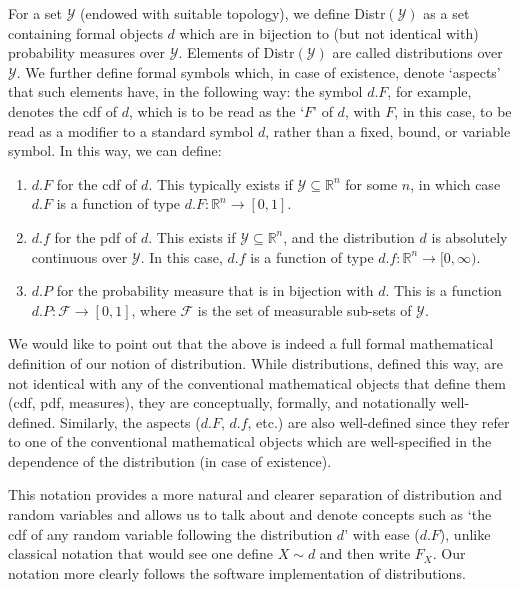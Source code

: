 For a set $\mathcal{Y}$ (endowed with suitable topology), we define Distr$(\mathcal{Y})$ as a set containing formal objects $d$ which are in bijection to (but not identical with) probability measures over $\mathcal{Y}$. Elements of Distr$(\mathcal{Y})$ are called distributions over $\mathcal{Y}$.
We further define formal symbols which, in case of existence, denote `aspects' that such elements have, in the following way: the symbol $d.F$, for example, denotes the cdf of $d$, which is to be read as the `$F$' of $d$, with $F$, in this case, to be read as a modifier to a standard symbol $d$, rather than a fixed, bound, or variable symbol. In this way, we can define:
\begin{enumerate}
\itemsep-0.2em
\item[(i)] $d.F$ for the cdf of $d$. This typically exists if $\mathcal{Y}\subseteq \mathbb{R}^n$ for some $n$, in which case $d.F$ is a function of type $d.F: \mathbb{R}^n \rightarrow [0,1]$.
\item[(ii)] $d.f$ for the pdf of $d$. This exists if $\mathcal{Y}\subseteq \mathbb{R}^n$, and the distribution $d$ is absolutely continuous over $\mathcal{Y}$. In this case, $d.f$ is a function of type $d.f: \mathbb{R}^n \rightarrow [0,\infty)$.
\item[(iii)] $d.P$ for the probability measure that is in bijection with $d$. This is a function $d.P: \mathcal{F} \rightarrow [0,1]$, where $\mathcal{F}$ is the set of measurable sub-sets of $\mathcal{Y}$.
\end{enumerate}

We would like to point out that the above is indeed a full formal mathematical definition of our notion of distribution. While distributions, defined this way, are not identical with any of the conventional mathematical objects that define them (cdf, pdf, measures), they are conceptually, formally, and notationally well-defined. Similarly, the aspects ($d.F$, $d.f$, etc.) are also well-defined since they refer to one of the conventional mathematical objects which are well-specified in the dependence of the distribution (in case of existence).

This notation provides a more natural and clearer separation of distribution and random variables and allows us to talk about and denote concepts such as `the cdf of any random variable following the distribution $d$' with ease ($d.F$), unlike classical notation that would see one define $X\sim d$ and then write $F_X$. Our notation more clearly follows the software implementation of distributions.

